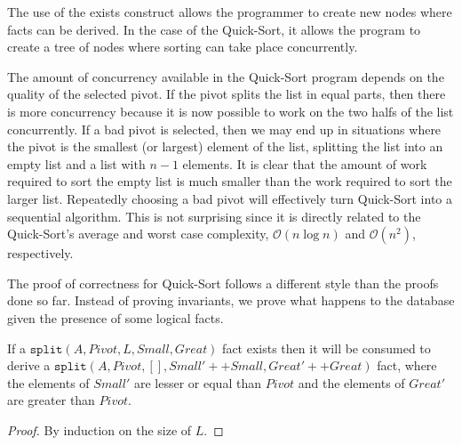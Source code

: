 The use of the exists construct allows the programmer to create new nodes where
facts can be derived. In the case of the Quick-Sort, it allows the program to
create a tree of nodes where sorting can take place concurrently.

The amount of concurrency available in the Quick-Sort program depends on the
quality of the selected pivot. If the pivot splits the list in equal parts, then
there is more concurrency because it is now possible to work on the two halfs of
the list concurrently. If a bad pivot is selected, then we may end up in
situations where the pivot is the smallest (or largest) element of the list,
splitting the list into an empty list and a list with $n-1$ elements. It is
clear that the amount of work required to sort the empty list is much smaller
than the work required to sort the larger list.  Repeatedly choosing a bad pivot
will effectively turn Quick-Sort into a sequential algorithm. This is not
surprising since it is directly related to the Quick-Sort's average and worst
case complexity, $\mathcal{O}(n \log{n})$ and $\mathcal{O}(n^2)$, respectively.

The proof of correctness for Quick-Sort follows a different style than the
proofs done so far. Instead of proving invariants, we prove what happens to the
database given the presence of some logical facts.

\begin{lemma}

If a $\mathtt{split}(A, Pivot, L, Small, Great)$ fact exists then it will be
consumed to derive a $\mathtt{split}(A, Pivot, [], Small' ++ Small, Great' ++
Great)$ fact, where the elements of $Small'$ are lesser or equal than $Pivot$
and the elements of $Great'$ are greater than $Pivot$.

\end{lemma}
\begin{proof}
By induction on the size of $L$.
\end{proof}

